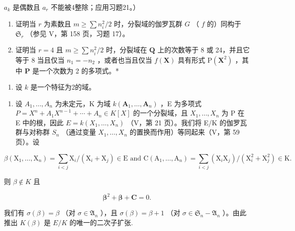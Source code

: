 \(a_{k}\) 是偶数且 \(a_{r}\) 不能被4整除；应用习题21。）

\begin{enumerate}
\def\labelenumi{\alph{enumi})}
\setcounter{enumi}{2}
\item
  证明当 \(r\) 为素数且 \(m \geqslant \sum n_i^2 / 2\) 时，分裂域的伽罗瓦群 \(G\) （ \(f\) 的）同构于 \(\mathfrak{S}_r\) （参见 V，第 158 页，习题 17）。
\item
  证明当 \(r = 4\) 且 \(m \geqslant \sum n_i^2 / 2\) 时，分裂域在 \(\mathbf{Q}\) 上的次数等于 8 或 24，并且它等于 8 当且仅当 \(n_1 = -n_2\) ，或者也当且仅当 \(f(\mathbf{X})\) 具有形式 \(\mathrm{P}(\mathbf{X}^2)\) ，其中 \(\mathbf{P}\) 是一个次数为 2 的多项式。*
\end{enumerate}

\begin{enumerate}
\def\labelenumi{\arabic{enumi})}
\setcounter{enumi}{22}
\tightlist
\item
  设 \(k\) 是一个特征为2的域。
\end{enumerate}

\begin{enumerate}
\def\labelenumi{\alph{enumi})}
\tightlist
\item
  设 \(A_{1}, \ldots, A_{n}\) 为未定元，K 为域 \(k(\mathbf{A}_{1}, \ldots, \mathbf{A}_{n})\) ，E 为多项式 \(P = X^{n} + A_{1}X^{n-1} + \cdots + A_{n} \in K[X]\) 的一个分裂域，且 \(X_{1}, \ldots, X_{n}\) 为 P 在 E 中的根，因此 \(E = k(X_{1}, \ldots, X_{n})\) （V，第 21 页）。我们将 E/K 的伽罗瓦群与对称群 \(S_{n}\) （通过变量 \(X_{1}, \ldots, X_{n}\) 的置换而作用）等同起来（V，第 59 页）。设
\end{enumerate}

\[
\beta \left(\mathrm{X} _ {1}, \dots , \mathrm{X} _ {n}\right) = \sum_ {i <   j} \mathrm{X} _ {i} / \left(\mathrm{X} _ {i} + \mathrm{X} _ {j}\right) \in \mathrm{E} \text { and } \mathrm{C} \left(\mathrm{A} _ {1}, \dots , \mathrm{A} _ {n}\right) = \sum_ {i <   j} \left(\mathrm{X} _ {i} \mathrm{X} _ {j}\right) / \left(\mathrm{X} _ {i} ^ {2} + \mathrm{X} _ {j} ^ {2}\right) \in \mathrm{K}.
\]

则 \(\beta \notin K\) 且

\[
\boldsymbol {\beta} ^ {2} + \boldsymbol {\beta} + \mathbf {C} = 0.
\]

我们有 \(\sigma(\beta) = \beta\) （对 \(\sigma \in \mathfrak{A}_n\) ），且 \(\sigma(\beta) = \beta + 1\) （对 \(\sigma \in \mathfrak{S}_n - \mathfrak{A}_n\) ）。由此推出 \(K(\beta)\) 是 \(E/K\) 的唯一的二次子扩张.

